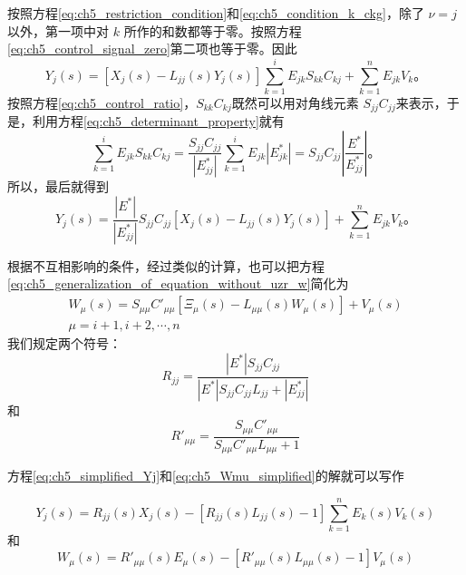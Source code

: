 按照方程\eqref{eq:ch5_restriction_condition}和\eqref{eq:ch5_condition_k_ckg}，除了 $\nu=j$ 以外，第一项中对 $k$ 所作的和数都等于零。按照方程\eqref{eq:ch5_control_signal_zero}第二项也等于零。因此
\begin{equation*}
Y_j(s) = [X_j(s) - L_{jj}(s)Y_j(s)]\sum_{k=1}^{i} E_{jk}S_{kk}C_{kj} + \sum_{k=1}^{n} E_{jk}V_k。
\end{equation*}
按照方程\eqref{eq:ch5_control_ratio}，$S_{kk}C_{kj}$既然可以用对角线元素 $S_{jj}C_{jj}$来表示，于是，利用方程\eqref{eq:ch5_determinant_property}就有
\begin{equation*}
\sum_{k=1}^{i} E_{jk}S_{kk}C_{kj} = \frac{S_{jj}C_{jj}}{|E_{jj}^{*}|}\sum_{k=1}^{i} E_{jk} |E_{jk}^{*}| = S_{jj}C_{jj} \left| \frac{E^{*}}{E_{jj}^{*}} \right|。
\end{equation*}
所以，最后就得到
\begin{equation}\label{eq:ch5_simplified_Yj}
Y_j(s) = \frac{|E^{*}|}{|E_{jj}^{*}|}S_{jj}C_{jj}[X_j(s) - L_{jj}(s)Y_j(s)] + \sum_{k=1}^{n} E_{jk}V_k。
\end{equation}

根据不互相影响的条件，经过类似的计算，也可以把方程\eqref{eq:ch5_generalization_of_equation_without_uzr_w}简化为
\begin{equation}\label{eq:ch5_Wmu_simplified}
\begin{array}{l}
W_\mu(s) = S_{\mu\mu}C'_{\mu\mu}[\Xi_\mu(s) - L_{\mu\mu}(s)W_\mu(s)] + V_\mu(s)\\
\mu = i + 1, i + 2, \cdots, n
\end{array}
\end{equation}
我们规定两个符号：
\begin{equation}\label{eq:ch5_Rjj_def}
R_{jj} = \frac{|E^{*}|S_{jj}C_{jj}}{|E^{*}|S_{jj}C_{jj}L_{jj} + |E_{jj}^{*}|}
\end{equation}
和
\begin{equation}\label{eq:ch5_Rpp_def}
R'_{\mu\mu} = \frac{S_{\mu\mu}C'_{\mu\mu}}{S_{\mu\mu}C'_{\mu\mu}L_{\mu\mu} + 1}
\end{equation}

方程\eqref{eq:ch5_simplified_Yj}和\eqref{eq:ch5_Wmu_simplified}的解就可以写作

\begin{equation}\label{eq:ch5_Yj_solution}
Y_j(s) = R_{jj}(s)X_j(s) - [R_{jj}(s)L_{jj}(s) - 1] \sum_{k=1}^n E_k(s)V_k(s)
\end{equation}
和
\begin{equation}\label{eq:ch5_Wmu_solution}
W_\mu(s) = R'_{\mu\mu}(s)E_\mu(s) - [R'_{\mu\mu}(s)L_{\mu\mu}(s) - 1]V_\mu(s)
\end{equation}

